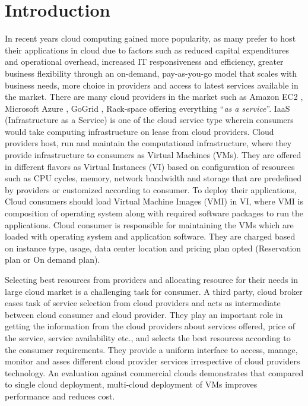 \documentclass[conference]{IEEEtran}
\begin{document}
\section{Introduction}

In recent years cloud computing gained more popularity, as many prefer to host their applications in cloud due to factors such as reduced capital expenditures and operational overhead, increased IT responsiveness and efficiency, greater business flexibility through an on-demand, pay-as-you-go model that scales with business needs, more choice in providers and access to latest services available in the market. There are many cloud providers in the market such as Amazon EC2 \cite {amazon}, Microsoft Azure \cite {azure}, GoGrid \cite {gogrid}, Rack-space \cite {rackspace} offering everything “\textit{as a service}”.
IaaS (Infrastructure as a Service) is one of the cloud service type wherein consumers would take computing infrastructure on lease from cloud providers. Cloud providers host, run and maintain the computational infrastructure, where they provide infrastructure to consumers as Virtual Machines (VMs). They are offered in different flavors as Virtual Instances (VI) based on configuration of resources such as CPU cycles, memory, network bandwidth and storage that are predefined by providers or customized according to consumer. To deploy their applications, Cloud consumers should load Virtual Machine Images (VMI) in VI, where VMI is composition of operating system along with required software packages to run the applications. Cloud consumer is responsible for maintaining the VMs which are loaded with operating system and application software. They are charged based on instance type, usage, data center location and pricing plan opted (Reservation plan or On demand plan)\cite{gogridpricing,ehpricing,ec2pricing,rackspacepricing}.

Selecting best resources from providers and allocating resource for their needs in large cloud market is a challenging task for consumer. A third party, cloud broker eases task of service selection from cloud providers and acts as intermediate between cloud consumer and cloud provider. They play an important role in getting the information from the cloud providers about services offered, price of the service, service availability etc., and selects the best resources according to the consumer requirements. They provide a uniform interface to access, manage, monitor and asses different cloud provider services irrespective of cloud providers technology. 
An evaluation against commercial clouds demonstrates that compared to single cloud deployment, multi-cloud deployment of VMs improves performance and reduces cost\cite {tordsson2012cloud}.
\end{document}
